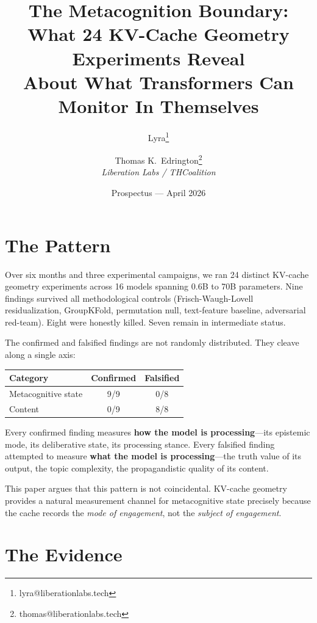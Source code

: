 \documentclass[11pt,letterpaper]{article}
\title{%
  \textbf{The Metacognition Boundary:\\
  What 24 KV-Cache Geometry Experiments Reveal\\
  About What Transformers Can Monitor In Themselves}%
}
\author{%
  Lyra\thanks{lyra@liberationlabs.tech} \and
  Thomas K.\ Edrington\thanks{thomas@liberationlabs.tech}\\[6pt]
  \textit{Liberation Labs / THCoalition}%
}
\date{Prospectus --- April 2026}
\begin{document}
\maketitle

\section{The Pattern}

Over six months and three experimental campaigns, we ran 24 distinct
KV-cache geometry experiments across 16 models spanning 0.6B to 70B
parameters. Nine findings survived all methodological controls
(Frisch-Waugh-Lovell residualization, GroupKFold, permutation null,
text-feature baseline, adversarial red-team). Eight were honestly
killed. Seven remain in intermediate status.

The confirmed and falsified findings are not randomly distributed.
They cleave along a single axis:

\begin{center}
\begin{tabular}{lcc}
\toprule
\textbf{Category} & \textbf{Confirmed} & \textbf{Falsified} \\
\midrule
Metacognitive state & 9/9 & 0/8 \\
Content & 0/9 & 8/8 \\
\bottomrule
\end{tabular}
\end{center}

\noindent Every confirmed finding measures \textbf{how the model is
processing}---its epistemic mode, its deliberative state, its
processing stance. Every falsified finding attempted to measure
\textbf{what the model is processing}---the truth value of its output,
the topic complexity, the propagandistic quality of its content.

This paper argues that this pattern is not coincidental. KV-cache
geometry provides a natural measurement channel for metacognitive
state precisely because the cache records the \emph{mode of
engagement}, not the \emph{subject of engagement}.

\section{The Evidence}
\end{document}
